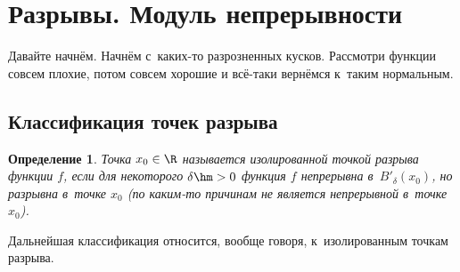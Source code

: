 \documentclass[a4paper,10pt,twoside]{article}
\newtheorem{Def}{Определение}[section]
\let\AVsection\section{}
\renewcommand\section{\newpage\scol\AVsection}
\newcommand{\scol}{  \renewcommand{\headrulewidth}{0.5pt}\fancyhead[RE,LO]{\thesection{} \leftmark} \fancyhead[LE,RO]{\thepage}}
\begin{document}
\section{Разрывы. Модуль непрерывности}

Давайте начнём. Начнём с~каких-то разрозненных кусков. Рассмотри функции совсем плохие, потом совсем хорошие и всё-таки вернёмся к~таким нормальным.

\subsection{Классификация точек разрыва}

\begin{Def}
    Точка $x_0\in\R$ называется изолированной точкой разрыва функции $f$, если для некоторого $\delta\hm>0$ функция $f$  непрерывна в~$B'_\delta(x_0)$, но разрывна в~точке $x_0$ (по каким-то причинам не является непрерывной в~точке $x_0$).
\end{Def}

Дальнейшая классификация относится, вообще говоря, к~изолированным точкам разрыва.
\end{document}
